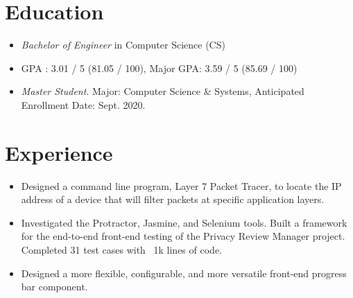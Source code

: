 \documentclass{resume}
\begin{document}



\section{Education}
\begin{itemize}
  \item \textit{Bachelor of Engineer} in Computer Science (CS)
  \item GPA : 3.01 / 5 (81.05 / 100), Major GPA: 3.59 / 5 (85.69 / 100)
\end{itemize}

\begin{itemize}
  \item \textit{Master Student}. Major: Computer Science \& Systems, Anticipated Enrollment Date: Sept. 2020. 
\end{itemize}

\section{Experience}
\begin{itemize}
  \item Designed a command line program, Layer 7 Packet Tracer, to locate the IP address of a device that will filter packets at specific application layers.
  \item Investigated the Protractor, Jasmine, and Selenium tools. Built a framework for the end-to-end front-end testing of the Privacy Review Manager project. Completed 31 test cases with ~1k lines of code.
  \item Designed a more flexible, configurable, and more versatile front-end progress bar component.
\end{itemize}
\end{document}
